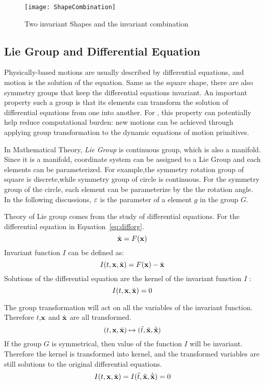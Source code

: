 \begin{figure}[!htbp]
  \begin{center}
    \texttt{[image: ShapeCombination]}
    \caption{Two invariant Shapes and the invariant combination}
    \label{fig:SymmetrySpace}
\end{center}
\end{figure}

\subsection{Lie Group and Differential Equation}
Physically-based motions are usually described by differential equations, and motion is the solution of the equation.
Same as the square shape, there are also symmetry groups that keep the differential equations invariant.
An important property such a group  is that its elements can transform the solution of differential equations from one into another\citep{olver1986applications}.
For \cms, this property  can potentially help reduce computational burden: new motions can be achieved through applying group transformation to the dynamic equations of motion primitives.




In Mathematical Theory, \emph{Lie Group} is continuous group, which is also a manifold.
Since it is a manifold, coordinate system can be assigned to a Lie Group and each elements can be parameterized.
For example,the symmetry rotation group of square is discrete,while symmetry group of circle is continuous.
For the symmetry group of the circle, each element can be parameterize by the the rotation angle.
In the following discussions,  $\varepsilon$ is the parameter of a element $g$ in the group $G$.

Theory of Lie group comes from the study of differential equations.
For the differential equation in Equation~\ref{eq:difforg}.
\begin{equation}
\label{eq:difforg}
\dot{\mathbf{x}}=F(\mathbf{x})
\end{equation}
Invariant function $I$ can be defined as:
\[
I(t,\mathbf{x},\dot{\mathbf{x}})=F(\mathbf{x})-\dot{\mathbf{x}}
\]
Solutions of the differential equation are the kernel of the invariant function $I$ :
 \[
 I(t,\mathbf{x},\dot{\mathbf{x}})=0
 \]
 
 
The group transformation will act on all the variables of the invariant function.
Therefore $t$,$\mathbf{x}$ and $\dot{\mathbf{x}}$ are all transformed.
\[
(t,\mathbf{x},\dot{\mathbf{x}}) \mapsto (\tilde{t},\tilde{\mathbf{x}},\dot{\tilde{\mathbf{x}}})
\]
If the group $G$ is symmetrical, then value of the  function $I$ will be invariant.
Therefore  the kernel is transformed into kernel, and the transformed variables are still solutions to the original differential equations. 
\[
I(t,\mathbf{x},\dot{\mathbf{x}})=I(\tilde{t},\tilde{\mathbf{x}},\dot{\tilde{\mathbf{x}}})=0
\]


